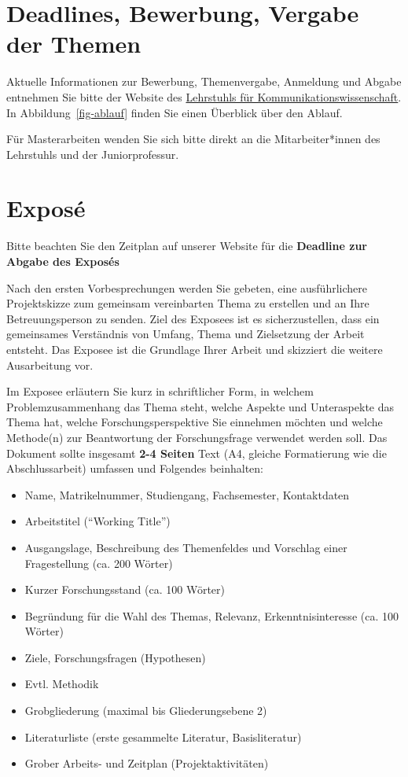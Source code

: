 \documentclass[
  letterpaper,
  DIV=11]{scrreprt}
\begin{document}
\hypertarget{deadlines-bewerbung-vergabe-der-themen}{%
\section{Deadlines, Bewerbung, Vergabe der
Themen}\label{deadlines-bewerbung-vergabe-der-themen}}

Aktuelle Informationen zur Bewerbung, Themenvergabe, Anmeldung und
Abgabe entnehmen Sie bitte der Website des
\href{https://www.kowi.rw.fau.de/studium/abschlussarbeiten/}{Lehrstuhls
für Kommunikationswissenschaft}. In Abbildung~\ref{fig-ablauf} finden
Sie einen Überblick über den Ablauf.

Für Masterarbeiten wenden Sie sich bitte direkt an die Mitarbeiter*innen
des Lehrstuhls und der Juniorprofessur.

\hypertarget{exposuxe9}{%
\section{Exposé}\label{exposuxe9}}

Bitte beachten Sie den Zeitplan auf unserer Website für die
\textbf{Deadline zur Abgabe des Exposés}

Nach den ersten Vorbesprechungen werden Sie gebeten, eine ausführlichere
Projektskizze zum gemeinsam vereinbarten Thema zu erstellen und an Ihre
Betreuungsperson zu senden. Ziel des Exposees ist es sicherzustellen,
dass ein gemeinsames Verständnis von Umfang, Thema und Zielsetzung der
Arbeit entsteht. Das Exposee ist die Grundlage Ihrer Arbeit und
skizziert die weitere Ausarbeitung vor.

Im Exposee erläutern Sie kurz in schriftlicher Form, in welchem
Problemzusammenhang das Thema steht, welche Aspekte und Unteraspekte das
Thema hat, welche Forschungsperspektive Sie einnehmen möchten und welche
Methode(n) zur Beantwortung der Forschungsfrage verwendet werden soll.
Das Dokument sollte insgesamt \textbf{2-4 Seiten} Text (A4, gleiche
Formatierung wie die Abschlussarbeit) umfassen und Folgendes beinhalten:

\begin{itemize}
\item
  Name, Matrikelnummer, Studiengang, Fachsemester, Kontaktdaten
\item
  Arbeitstitel (``Working Title'')
\item
  Ausgangslage, Beschreibung des Themenfeldes und Vorschlag einer
  Fragestellung (ca. 200 Wörter)
\item
  Kurzer Forschungsstand (ca. 100 Wörter)
\item
  Begründung für die Wahl des Themas, Relevanz, Erkenntnisinteresse (ca.
  100 Wörter)
\item
  Ziele, Forschungsfragen (Hypothesen)
\item
  Evtl. Methodik
\item
  Grobgliederung (maximal bis Gliederungsebene 2)
\item
  Literaturliste (erste gesammelte Literatur, Basisliteratur)
\item
  Grober Arbeits- und Zeitplan (Projektaktivitäten)
\end{itemize}
\end{document}
